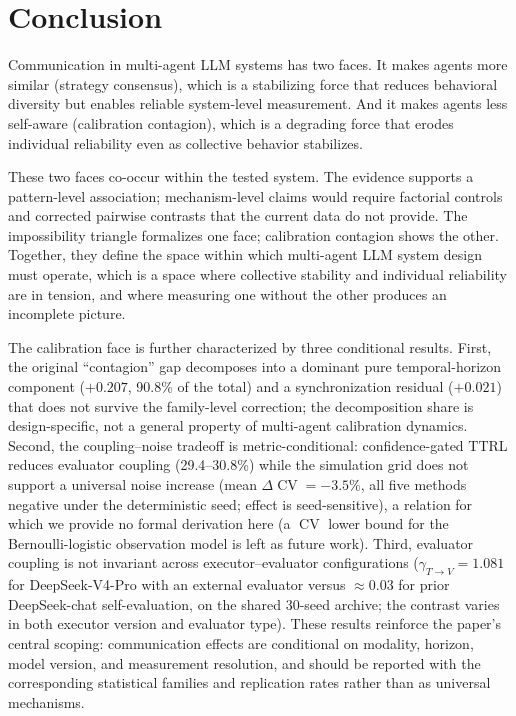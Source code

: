 \documentclass[11pt]{article}
\DeclareMathOperator{\CV}{CV}
\begin{document}
\section{Conclusion}

Communication in multi-agent LLM systems has two faces. It makes agents more similar (strategy consensus), which is a stabilizing force that reduces behavioral diversity but enables reliable system-level measurement. And it makes agents less self-aware (calibration contagion), which is a degrading force that erodes individual reliability even as collective behavior stabilizes.

These two faces co-occur within the tested system. The evidence supports a pattern-level association; mechanism-level claims would require factorial controls and corrected pairwise contrasts that the current data do not provide. The impossibility triangle formalizes one face; calibration contagion shows the other. Together, they define the space within which multi-agent LLM system design must operate, which is a space where collective stability and individual reliability are in tension, and where measuring one without the other produces an incomplete picture.

The calibration face is further characterized by three conditional results. First, the original ``contagion'' gap decomposes into a dominant pure temporal-horizon component ($+0.207$, 90.8\% of the total) and a synchronization residual ($+0.021$) that does not survive the family-level correction; the decomposition share is design-specific, not a general property of multi-agent calibration dynamics. Second, the coupling--noise tradeoff is metric-conditional: confidence-gated TTRL reduces evaluator coupling (29.4--30.8\%) while the simulation grid does not support a universal noise increase (mean $\Delta\CV = -3.5\%$, all five methods negative under the deterministic seed; effect is seed-sensitive), a relation for which we provide no formal derivation here (a $\CV$ lower bound for the Bernoulli-logistic observation model is left as future work). Third, evaluator coupling is not invariant across executor--evaluator configurations ($\gamma_{T\to V}{=}1.081$ for DeepSeek-V4-Pro with an external evaluator versus $\approx 0.03$ for prior DeepSeek-chat self-evaluation, on the shared 30-seed archive; the contrast varies in both executor version and evaluator type). These results reinforce the paper's central scoping: communication effects are conditional on modality, horizon, model version, and measurement resolution, and should be reported with the corresponding statistical families and replication rates rather than as universal mechanisms.
\end{document}
